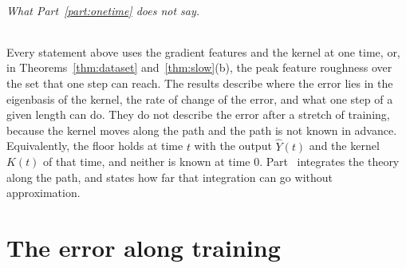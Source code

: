 \documentclass[11pt]{article}
\theoremstyle{definition}
\theoremstyle{remark}
\begin{document}
\paragraph{What Part~\ref{part:onetime} does not say.}
Every statement above uses the gradient features and the kernel at one time, or, in Theorems~\ref{thm:dataset} and~\ref{thm:slow}(b), the peak feature roughness over the set that one step can reach.
The results describe where the error lies in the eigenbasis of the kernel, the rate of change of the error, and what one step of a given length can do.
They do not describe the error after a stretch of training, because the kernel moves along the path and the path is not known in advance.
Equivalently, the floor holds at time $t$ with the output $\hat Y(t)$ and the kernel $K(t)$ of that time, and neither is known at time 0.
Part~\ref{part:path} integrates the theory along the path, and states how far that integration can go without approximation.

\part{The error along training}\label{part:path}
\end{document}

